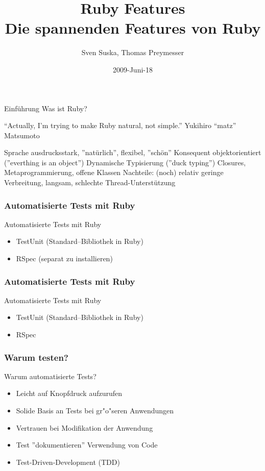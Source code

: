 \documentclass{beamer}
\title[Ruby]{Ruby Features\\Die spannenden Features von Ruby}
\author{Sven Suska, Thomas Preymesser}
\date{2009-Juni-18}
\begin{document}
\lstset{language=Ruby}
\begin{frame}
\titlepage
\end{frame}


\begin{frame}{Einführung}
Was ist Ruby?

“Actually, I'm trying to make Ruby natural, not simple.”
Yukihiro “matz” Matsumoto

Sprache ausdrucksstark, ”natürlich”, flexibel, ”schön”
Konsequent objektorientiert (”everthing is an object”)
Dynamische Typisierung (”duck typing”)
Closures, Metaprogrammierung, offene Klassen
Nachteile: (noch) relativ geringe Verbreitung, langsam, 
schlechte Thread-Unterstützung

\end{frame}

\begin{frame}
  \frametitle{Automatisierte Tests mit Ruby}
  Automatisierte Tests mit Ruby
  \begin{itemize}
    \item<1-> TestUnit (Standard--Bibliothek in Ruby)
    \item<2-> RSpec (separat zu installieren)
  \end{itemize}
\end{frame}

\begin{frame}
  \frametitle{Automatisierte Tests mit Ruby}
  Automatisierte Tests mit Ruby
  \begin{itemize}
    \item TestUnit (Standard--Bibliothek in Ruby)
    \pause
    \item RSpec 
  \end{itemize}
\end{frame}

\begin{frame}

 \frametitle{Warum testen?}
  Warum automatisierte Tests?
  \begin{itemize}
    \item Leicht auf Knopfdruck aufzurufen
    \item Solide Basis an Tests bei gr"o"seren Anwendungen
    \item Vertrauen bei Modifikation der Anwendung
    \item Test ''dokumentieren'' Verwendung von Code
    \item Test-Driven-Development (TDD)
  \end{itemize}
\end{frame}
\end{document}
